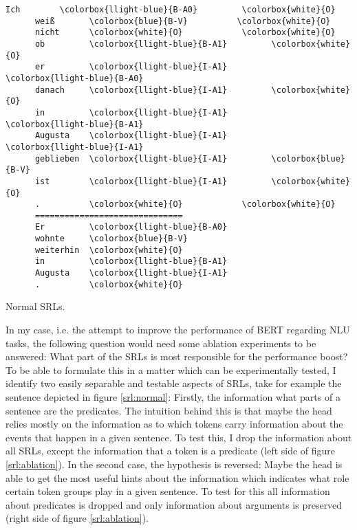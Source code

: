 {\begin{minipage}{1.0\linewidth}
  \begin{srl}
  \centering
    \begin{BVerbatim}[commandchars=\\\{\}, fontsize=\footnotesize]
      Ich        \colorbox{llight-blue}{B-A0}         \colorbox{white}{O}
      weiß       \colorbox{blue}{B-V}          \colorbox{white}{O}
      nicht      \colorbox{white}{O}            \colorbox{white}{O}
      ob         \colorbox{llight-blue}{B-A1}         \colorbox{white}{O}
      er         \colorbox{llight-blue}{I-A1}         \colorbox{llight-blue}{B-A0}
      danach     \colorbox{llight-blue}{I-A1}         \colorbox{white}{O}
      in         \colorbox{llight-blue}{I-A1}         \colorbox{llight-blue}{B-A1}
      Augusta    \colorbox{llight-blue}{I-A1}         \colorbox{llight-blue}{I-A1}
      geblieben  \colorbox{llight-blue}{I-A1}         \colorbox{blue}{B-V}
      ist        \colorbox{llight-blue}{I-A1}         \colorbox{white}{O}
      .          \colorbox{white}{O}            \colorbox{white}{O}
      ==============================
      Er         \colorbox{llight-blue}{B-A0}
      wohnte     \colorbox{blue}{B-V}
      weiterhin  \colorbox{white}{O}
      in         \colorbox{llight-blue}{B-A1}
      Augusta    \colorbox{llight-blue}{I-A1}
      .          \colorbox{white}{O}
    \end{BVerbatim}
    \caption{Normal SRLs.}
    \label{srl:normal}
  \end{srl}
\end{minipage}

In my case, i.e. the attempt to improve the performance of BERT regarding NLU tasks, the
following question would need some ablation experiments to be answered: What part of the SRLs
is most responsible for the performance boost? To be able to formulate this in a matter which
can be experimentally tested, I identify two easily separable and testable aspects of SRLs,
take for example the sentence depicted in figure \ref{srl:normal}: Firstly, the information
what parts of a sentence are the predicates. The intuition behind this is that maybe the
head relies mostly on the information as to which tokens carry information about the events
that happen in a given sentence. To test this, I drop the information about all SRLs,
except the information that a token is a predicate (left side of figure \ref{srl:ablation}).
In the second case, the hypothesis is reversed: Maybe the head is able to get the most useful
hints about the information which indicates what role certain token groups play in a given
sentence. To test for this all information about predicates is dropped and only information
about arguments is preserved (right side of figure \ref{srl:ablation}).

}
